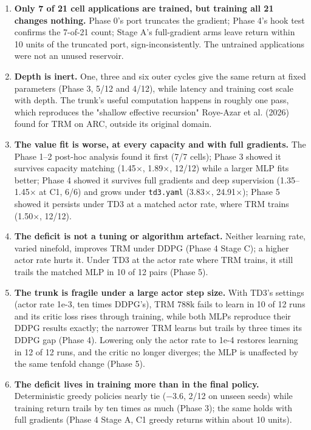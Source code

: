 \documentclass[11pt]{article}
\begin{document}
\begin{enumerate}
\item \textbf{Only 7 of 21 cell applications are trained, but training all 21 changes nothing.} Phase 0's port truncates the gradient; Phase 4's hook test confirms the 7-of-21 count; Stage A's full-gradient arms leave return within 10 units of the truncated port, sign-inconsistently. The untrained applications were not an unused reservoir.
\item \textbf{Depth is inert.} One, three and six outer cycles give the same return at fixed parameters (Phase 3, 5/12 and 4/12), while latency and training cost scale with depth. The trunk's useful computation happens in roughly one pass, which reproduces the "shallow effective recursion" Roye-Azar et al. (2026) found for TRM on ARC, outside its original domain.
\item \textbf{The value fit is worse, at every capacity and with full gradients.} The Phase 1--2 post-hoc analysis found it first (7/7 cells); Phase 3 showed it survives capacity matching (1.45$\times$, 1.89$\times$, 12/12) while a larger MLP fits better; Phase 4 showed it survives full gradients and deep supervision (1.35--1.45$\times$ at C1, 6/6) and grows under \texttt{td3.yaml} (3.83$\times$, 24.91$\times$); Phase 5 showed it persists under TD3 at a matched actor rate, where TRM trains (1.50$\times$, 12/12).
\item \textbf{The deficit is not a tuning or algorithm artefact.} Neither learning rate, varied ninefold, improves TRM under DDPG (Phase 4 Stage C); a higher actor rate hurts it. Under TD3 at the actor rate where TRM trains, it still trails the matched MLP in 10 of 12 pairs (Phase 5).
\item \textbf{The trunk is fragile under a large actor step size.} With TD3's settings (actor rate 1e-3, ten times DDPG's), TRM 788k fails to learn in 10 of 12 runs and its critic loss rises through training, while both MLPs reproduce their DDPG results exactly; the narrower TRM learns but trails by three times its DDPG gap (Phase 4). Lowering only the actor rate to 1e-4 restores learning in 12 of 12 runs, and the critic no longer diverges; the MLP is unaffected by the same tenfold change (Phase 5).
\item \textbf{The deficit lives in training more than in the final policy.} Deterministic greedy policies nearly tie ($-$3.6, 2/12 on unseen seeds) while training return trails by ten times as much (Phase 3); the same holds with full gradients (Phase 4 Stage A, C1 greedy returns within about 10 units).

\end{enumerate}
\end{document}
